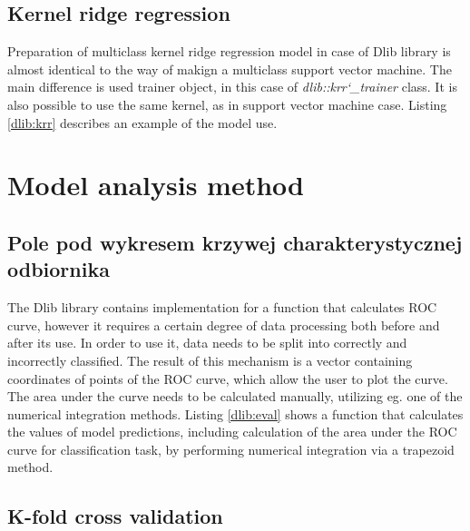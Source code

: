 
\subsection{Kernel ridge regression}

Preparation of multiclass kernel ridge regression model in case of Dlib library is almost identical to the way of makign a multiclass support vector machine. The main difference is used trainer object, in this case of \textit{dlib::krr\char`_trainer} class. It is also possible to use the same kernel, as in support vector machine case. Listing \ref{dlib:krr} describes an example of the model use.


\section{Model analysis method}

\subsection{Pole pod wykresem krzywej charakterystycznej odbiornika}

The Dlib library contains implementation for a function that calculates ROC curve, however it requires a certain degree of data processing both before and after its use. In order to use it, data needs to be split into correctly and incorrectly classified. The result of this mechanism is a vector containing coordinates of points of the ROC curve, which allow the user to plot the curve. The area under the curve needs to be calculated manually, utilizing eg. one of the numerical integration methods. Listing \ref{dlib:eval} shows a function that calculates the values of model predictions, including calculation of the area under the ROC curve for classification task, by performing numerical integration via a trapezoid method.


\subsection{K-fold cross validation}

